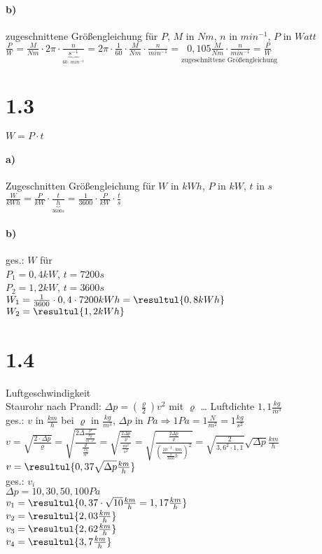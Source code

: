 \paragraph{b)} zugeschnittene Größengleichung für $P$, $M$ in $Nm$, $n$ in $min^{-1}$, $P$ in $Watt$\\
$\frac{P}{W}=\frac{M}{Nm} \cdot 2 \pi \cdot \frac{n}{\underbrace{s^{-1}}_{60\cdot min^{-1}}}=2\pi \cdot \frac{1}{60} \cdot \frac{M}{Nm} \cdot \frac{n}{min^{-1}}=\underset{\text{zugeschnittene Größengleichung}}{\boxed{0,105\frac{M}{Nm}\cdot \frac{n}{min^{-1}}=\frac{P}{W}}}$

\section*{1.3}
$\boxed{W=P\cdot t}$
\paragraph{a)} Zugeschnitten Größengleichung für $W$ in $kWh$, $P$ in $kW$, $t$ in $s$\\
$\frac{W}{kWh}=\frac{P}{kW}\cdot \frac{t}{\underbrace{h}_{3600s}}=\frac{1}{3600}\cdot \frac{P}{kW} \cdot \frac{t}{s}$

\paragraph{b)} ges.: $W$ für\\
$P_1=0,4kW$, $t=7200s$\\
$P_2=1,2kW$, $t=3600s$\medskip\\
$W_1=\frac{1}{3600} \cdot 0,4 \cdot 7200kWh=\resultul{0,8kWh}$\smallskip\\
$W_2=\resultul{1,2kWh}$

\section*{1.4}
Luftgeschwindigkeit\\
Staurohr nach Prandl: $\Delta p = (\frac{\varrho}{2})v^2$ mit $\varrho$ … Luftdichte $1,1 \frac{kg}{m^3}$\\
ges.: $v$ in $\frac{km}{h}$ bei $\varrho$ in $\frac{kg}{m^3}$, $\Delta p$ in $Pa \Rightarrow 1 Pa = 1\frac{N}{m^2}= 1 \frac{kg}{s^2}$\\
$v=\sqrt{\frac{2\cdot \Delta p}{\varrho}}=\sqrt{\frac{2\Delta \frac{p}{\frac{kg}{m\cdot s^2}}}{\frac{\varrho}{\frac{kg}{m^3}}}}=\sqrt{\frac{\frac{2\Delta p}{\varrho}}{\frac{m^2}{s^2}}}=\sqrt{\frac{\frac{2 \Delta p}{\varrho}}{(\frac{10^{-3}\cdot km}{\frac{1}{3600}h})^2}}=\sqrt{\frac{2}{3,6^2\cdot 1,1}}\sqrt{\Delta p}\frac{km}{h}$\\
$v=\resultul{0,37\sqrt{\Delta p}\frac{km}{h}}$\medskip\\
ges.: $v_i$\\
$\Delta p = 10,30,50,100 Pa$\\
$v_1=\resultul{0,37\cdot \sqrt{10}\frac{km}{h}=1,17\frac{km}{h}}$\\
$v_2=\resultul{2,03\frac{km}{h}}$\\
$v_3=\resultul{2,62\frac{km}{h}}$\\
$v_4=\resultul{3,7 \frac{km}{h}}$

